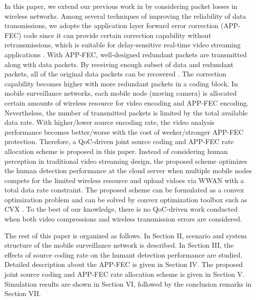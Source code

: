 \documentclass[journal]{IEEEtran}
\begin{document}
In this paper, we extend our previous work in \cite{CHLQ15} by considering packet losses in wireless networks. Among several techniques of improving the reliability of data transmissions, we adopte the application layer forward error correction (APP-FEC) code since it can provide certain correction capability without retransmissions, which is suitable for delay-sensitive real-time video streaming applications \cite{JuFJ09,LuSW08,CHRL15}. With APP-FEC, well-designed redundant packets are transmitted along with data packets. By receiving enough subset of data and redundant packets, all of the original data packets can be recovered \cite{JuFJ09}. The correction capability becomes higher with more redundant packets in a coding block. In mobile surveillance networks, each mobile node (moving camera) is allocated certain amounts of wireless resource for video encoding and APP-FEC encoding. Nevertheless, the number of transmitted packets is limited by the total available data rate. With higher/lower source encoding rate, the video analysis performance becomes better/worse with the cost of weeker/stronger APP-FEC protection. Therefore, a QoC-driven joint source coding and APP-FEC rate allocation scheme is proposed in this paper. Instead of considering human perception in traditional video streaming design, the proposed scheme optimizes the human detection performance at the cloud server when multiple mobile nodes compete for the limited wireless resource and upload vidoes via WWAN with a total data rate constraint. The proposed scheme can be formulated as a convex optimization problem \cite{BoVa04} and can be solved by convex optimization toolbox such as CVX \cite{CVX}. To the best of our knowledge, there is no QoC-driven work conducted when both video compressions and wireless transmission errors are considered.

The rest of this paper is organized as follows. In Section II, scenario and system structure of the mobile surveillance network is described. In Section III, the effects of source coding rate on the humant detection performance are studied. Detailed description about the APP-FEC is given in Section IV. The proposed joint source coding and APP-FEC rate allocation scheme is given in Section V. Simulation results are shown in Section VI, followed by the conclusion remarks in Section VII.
\end{document}
